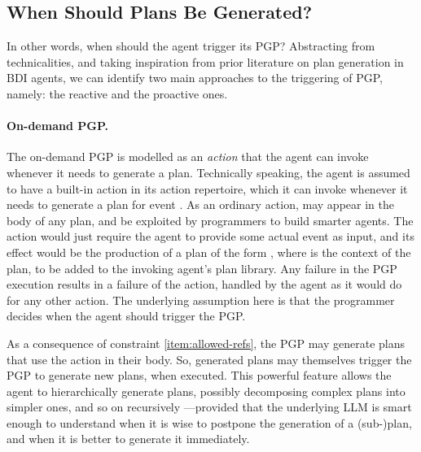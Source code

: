 \subsection{When Should Plans Be Generated?}\label{sec:pgp-when}
In other words,
when should the agent trigger its \ac{PGP}?
%
Abstracting from technicalities,
and taking inspiration from prior literature on plan generation in \ac{BDI} agents,
we can identify two %
main approaches to the triggering of \ac{PGP},
namely:
the reactive and the proactive ones. %
%

\paragraph{On-demand \acs{PGP}.}

The on-demand \ac{PGP} is modelled as an \emph{action} that the agent can invoke whenever it needs to generate a plan.
%
Technically speaking,
the agent is assumed to have a built-in action  in its action repertoire,
which it can invoke whenever it needs to generate a plan for event .
%
As an ordinary \agentspeak{} action,
 may appear in the body of any plan,
and be exploited by programmers to build smarter agents.
%
The action would just require the agent to provide some actual event  as input,
and its effect would be the production of a plan of the form ,
where  is the context of the plan,
to be added to the invoking agent's plan library.
%
Any failure in the \ac{PGP} execution results in a failure of the action,
handled by the agent as it would do for any other action.
%
The underlying assumption here is that
the programmer decides when the agent should trigger the \ac{PGP}.
%

As a consequence of constraint \ref{item:allowed-refs},
the \ac{PGP} may generate plans that use the  action in their body.
%
So, generated plans may themselves trigger the \ac{PGP} to generate new plans, when executed.
%
This powerful feature allows the agent to hierarchically generate plans,
possibly decomposing complex plans into simpler ones,
and so on recursively%
---provided that
the underlying \ac{LLM} is smart enough to understand when it is wise to postpone the generation of a (sub-)plan,
and when it is better to generate it immediately.

